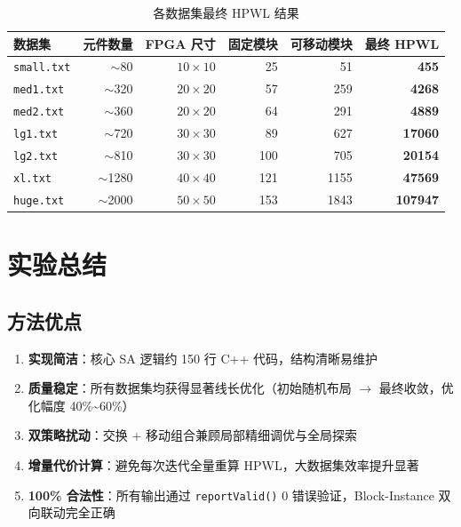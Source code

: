 \documentclass[12pt,a4paper]{ctexart}
\begin{document}
\begin{table}[H]
\centering
\caption{各数据集最终 HPWL 结果}
\begin{tabular}{@{}lrrrrr@{}}
\toprule
\textbf{数据集} & \textbf{元件数量} & \textbf{FPGA 尺寸} & \textbf{固定模块} & \textbf{可移动模块} & \textbf{最终 HPWL} \\
\midrule
\texttt{small.txt}  & $\sim$80   & $10\times10$ & 25  & 51   & \textbf{455}   \\
\texttt{med1.txt}   & $\sim$320  & $20\times20$ & 57  & 259  & \textbf{4268}  \\
\texttt{med2.txt}   & $\sim$360  & $20\times20$ & 64  & 291  & \textbf{4889}  \\
\texttt{lg1.txt}    & $\sim$720  & $30\times30$ & 89  & 627  & \textbf{17060} \\
\texttt{lg2.txt}    & $\sim$810  & $30\times30$ & 100 & 705  & \textbf{20154} \\
\texttt{xl.txt}     & $\sim$1280 & $40\times40$ & 121 & 1155 & \textbf{47569} \\
\texttt{huge.txt}   & $\sim$2000 & $50\times50$ & 153 & 1843 & \textbf{107947} \\
\bottomrule
\end{tabular}
\end{table}

\section{实验总结}

\subsection{方法优点}

\begin{enumerate}[label=(\arabic*), leftmargin=*]
    \item \textbf{实现简洁}：核心 SA 逻辑约 150 行 C++ 代码，结构清晰易维护
    \item \textbf{质量稳定}：所有数据集均获得显著线长优化（初始随机布局 $\to$ 最终收敛，优化幅度 40\%\textasciitilde60\%）
    \item \textbf{双策略扰动}：交换 + 移动组合兼顾局部精细调优与全局探索
    \item \textbf{增量代价计算}：避免每次迭代全量重算 HPWL，大数据集效率提升显著
    \item \textbf{100\% 合法性}：所有输出通过 \texttt{reportValid()} 0 错误验证，Block-Instance 双向联动完全正确
\end{enumerate}
\end{document}
